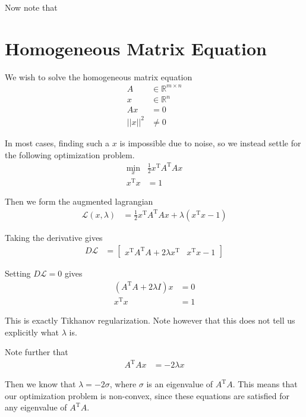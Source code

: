 \documentclass{article}
\begin{document}
Now note that 

\section{Homogeneous Matrix Equation}

We wish to solve the homogeneous matrix equation
\begin{align*}
    A &\in \mathbb{R}^{m \times n} \\
    x &\in \mathbb{R}^n \\
    A x &= 0 \\
    || x ||^2 &\ne 0
\end{align*}

In most cases, finding such a $x$ is impossible due to noise, so we instead settle for the following optimization problem.
\begin{align*}
    \min_x & \frac{1}{2} x^\mathrm{T} A^\mathrm{T} A x \\
    x^\mathrm{T} x &= 1
\end{align*}

Then we form the augmented lagrangian
\begin{align*}
    \mathcal{L}(x, \lambda) &= \frac{1}{2} x^\mathrm{T} A^\mathrm{T} A x + \lambda (x^\mathrm{T} x - 1)
\end{align*}

Taking the derivative gives
\begin{align*}
    D \mathcal{L} &= \begin{bmatrix}
        x^\mathrm{T} A^\mathrm{T} A + 2\lambda x^\mathrm{T} & x^\mathrm{T} x - 1
    \end{bmatrix}
\end{align*}

Setting $D \mathcal{L} = 0$ gives
\begin{align*}
    \left(A^\mathrm{T} A + 2\lambda I \right) x &= 0 \\
    x^\mathrm{T} x &= 1
\end{align*}

This is exactly Tikhanov regularization. Note however that this does not tell us explicitly what $\lambda$ is.

Note further that
\begin{align*}
    A^\mathrm{T} A x &= - 2\lambda x
\end{align*}

Then we know that $\lambda = -2\sigma$, where $\sigma$ is an eigenvalue of $A^\mathrm{T} A$. This means that our optimization problem is non-convex, since these equations are satisfied for any eigenvalue of $A^\mathrm{T}A$.
\end{document}
